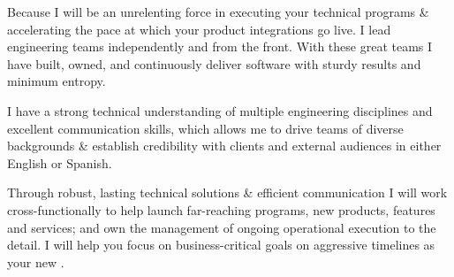 Because I will be an unrelenting force in executing your technical programs \& accelerating the pace at which your product integrations go live. I lead engineering teams independently and from the front. With these great teams I have built, owned, and continuously deliver software with sturdy results and minimum entropy.

I have a strong technical understanding of multiple engineering disciplines and excellent communication skills, which allows me to drive teams of diverse backgrounds \& establish credibility with clients and external audiences in either English or Spanish. 

Through robust, lasting technical solutions \& efficient communication I will work cross-functionally to help launch far-reaching programs, new products, features and services; and own the management of ongoing operational execution to the detail. I will help you focus on business-critical goals on aggressive timelines as your new \jobTitle.